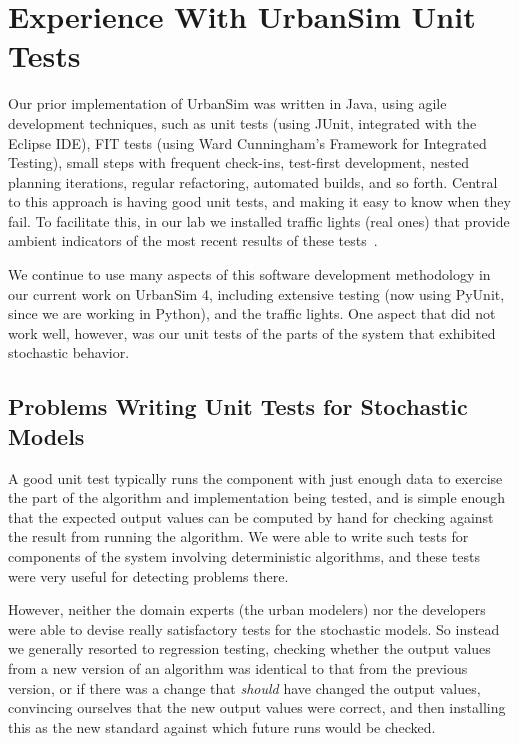 
\section{Experience With UrbanSim Unit Tests}
\label{prior-experience}

Our prior implementation of UrbanSim was written in Java, using agile
development techniques, such as unit tests (using JUnit, integrated with
the Eclipse IDE), FIT tests (using Ward Cunningham's Framework for
Integrated Testing), small steps with frequent check-ins, test-first
development, nested planning iterations, regular refactoring, automated
builds, and so forth.  Central to this approach is having good unit tests,
and making it easy to know when they fail.  To facilitate this, in our lab
we installed traffic lights (real ones) that provide ambient indicators of
the most recent results of these tests~\cite{freeman-benson-agile-2003}.

We continue to use many aspects of this software development methodology in
our current work on UrbanSim 4, including extensive testing (now using PyUnit,
since we are working in Python), and the traffic lights.  One aspect that did
not work well, however, was our unit tests of the parts of the system
that exhibited stochastic behavior.

\subsection{Problems Writing Unit Tests for Stochastic Models}

A good
unit test typically runs the component with just enough data to exercise the
part of the algorithm and implementation being tested, and is simple enough
that the expected output values can be computed by hand for checking against
the result from running the algorithm.  We were able to write such tests for
components of the system involving deterministic algorithms, and these tests
were very useful for detecting problems there.

However, neither the domain
experts (the urban modelers) nor the developers were able to devise really
satisfactory tests for the stochastic models.  So instead we generally
resorted to regression testing, checking whether the output values from a new
version of an algorithm was identical to that from the previous version, or if
there was a change that \emph{should} have changed the output values,
convincing ourselves that the new output values were correct, and then
installing this as the new standard against which future runs would be
checked.

